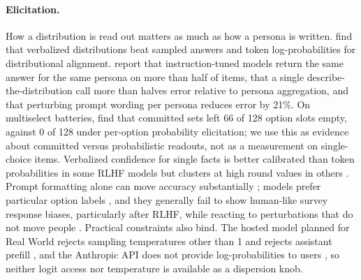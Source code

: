 \documentclass[11pt]{article}
\begin{document}
\paragraph{Elicitation.}
How a distribution is read out matters as much as how a persona is written. \citet{meister2025benchmarking} find that verbalized distributions beat sampled answers and token log-probabilities for distributional alignment. \citet{jang2026cannot} report that instruction-tuned models return the same answer for the same persona on more than half of items, that a single describe-the-distribution call more than halves error relative to persona aggregation, and that perturbing prompt wording per persona reduces error by 21\%. On multiselect batteries, \citet{doudkin2026marginal} find that committed sets left 66 of 128 option slots empty, against 0 of 128 under per-option probability elicitation; we use this as evidence about committed versus probabilistic readouts, not as a measurement on single-choice items. Verbalized confidence for single facts is better calibrated than token probabilities in some RLHF models \citep{tian2023justask} but clusters at high round values in others \citep{xiong2023uncertainty}. Prompt formatting alone can move accuracy substantially \citep{sclar2023spurious}; models prefer particular option labels \citep{zheng2023selectors}, and they generally fail to show human-like survey response biases, particularly after RLHF, while reacting to perturbations that do not move people \citep{tjuatja2023response}. Practical constraints also bind. The hosted model planned for Real World rejects sampling temperatures other than 1 and rejects assistant prefill \citep{anthropic2026haiku55}, and the Anthropic API does not provide log-probabilities to users \citep{meister2025benchmarking}, so neither logit access nor temperature is available as a dispersion knob.
\end{document}
